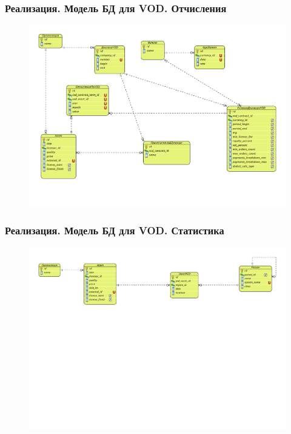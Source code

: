 \documentclass{beamer}
\begin{document}
\begin{frame}[t]
\frametitle{Реализация. Модель БД для VOD. Отчисления}
\begin{figure}
\begin{center}
\vspace{-1cm}
\hspace*{-1cm} \includegraphics[scale=0.43]{../resources/uml/VOD_DEDUCT.pdf}
\end{center}
\end{figure}
\end{frame}

\begin{frame}[t]
\frametitle{Реализация. Модель БД для VOD. Статистика}
\begin{figure}
\begin{center}
\vspace{1cm}
\hspace*{-1cm} \includegraphics[scale=0.43]{../resources/uml/VOD_STAT.pdf}
\end{center}
\end{figure}
\end{frame}
\end{document}

